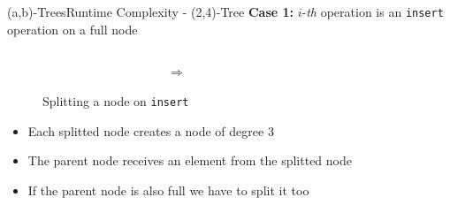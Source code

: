 
\begin{frame}{(a,b)-Trees}{Runtime Complexity - (2,4)-Tree}
  \textbf{Case 1:}
  {\color{MainA}$i$}-\textit{th} operation is an
  \texttt{\color{MainA}insert} operation on a full node
  \begin{figure}
    \begin{columns}
      \begin{column}{0.35\linewidth}
        \begin{adjustbox}{width=\linewidth}
          
        \end{adjustbox}
      \end{column}
      \begin{column}{0.1\linewidth}
        \begin{center}
          $\Rightarrow$
        \end{center}
      \end{column}
      \begin{column}{0.35\linewidth}
        \begin{adjustbox}{width=\linewidth}
          
        \end{adjustbox}
      \end{column}
    \end{columns}
    \caption{Splitting a node on \texttt{\color{MainA}insert}}
    \label{fig:a_b_tree:node_split_potential}
  \end{figure}
  \begin{itemize}
    \item<3->
      Each splitted node creates a node of {\color{MainA}degree 3}
    \item<4->
      The parent node receives an element from the splitted node
    \item<5->
      If the parent node is also full we have to split it too
  \end{itemize}
\end{frame}


